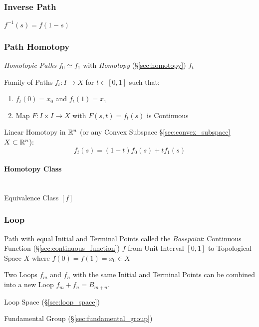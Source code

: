 \subsubsection{Inverse Path}\label{sec:inverse_path}

$f^{-1}(s) = f(1-s)$



\subsubsection{Path Homotopy}\label{sec:path_homotopy}

\emph{Homotopic Paths} $f_0 \simeq f_1$ with \emph{Homotopy}
(\S\ref{sec:homotopy}) $f_t$

Family of Paths $f_t : I \rightarrow X$ for $t \in [0,1]$ such that:
\begin{enumerate}
  \item $f_t(0) = x_0$ and $f_t(1) = x_1$
  \item Map $F : I \times I \rightarrow X$ with $F(s,t) = f_t(s)$ is
    Continuous
\end{enumerate}

Linear Homotopy in $\mathbb{R}^n$ (or any Convex Subspace
\S\ref{sec:convex_subspace} $X \subset \mathbb{R}^n$):
\[
  f_t(s) = (1 - t) f_0(s) + t f_1(s)
\]



\paragraph{Homotopy Class}\label{sec:homotopy_class}
\hfill \\

Equivalence Class $[f]$



\subsubsection{Loop}\label{sec:loop}

Path with equal Initial and Terminal Points called the
\emph{Basepoint}: Continuous Function
(\S\ref{sec:continuous_function}) $f$ from Unit Interval $[0,1]$ to
Topological Space $X$ where $f(0) = f(1) = x_0 \in X$

Two Loops $f_m$ and $f_n$ with the same Initial and Terminal Points
can be combined into a new Loop $f_m + f_n = B_{m+n}$.
\cite{hatcher02}

Loop Space (\S\ref{sec:loop_space})

Fundamental Group (\S\ref{sec:fundamental_group})

